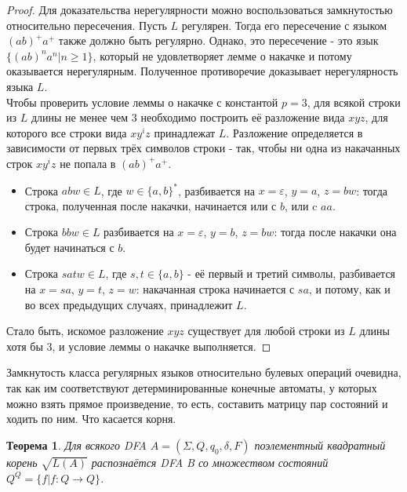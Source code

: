 \documentclass[a4paper]{article}
\theoremstyle{indented}
\newtheorem{theorem}{Теорема}
\theoremstyle{definition}
\theoremstyle{remark}
\DeclareMathOperator{\ra}{\rightarrow}
\begin{document}
\begin{proof}
    Для доказательства нерегулярности можно воспользоваться замкнутостью относительно пересечения. Пусть $L$ регулярен. Тогда его пересечение с языком $(ab)^+a^+$ также должно быть регулярно. Однако, это пересечение - это язык $\{ (ab)^n a^n | n \geq 1 \}$, который не удовлетворяет лемме о накачке и потому оказывается нерегулярным. Полученное противоречие доказывает нерегулярность языка $L$. \\ 

    Чтобы проверить условие леммы о накачке с константой $p = 3$, для всякой строки из $L$ длины не менее чем 3 необходимо построить её разложение вида $xyz$, для которого все строки вида $xy^iz$ принадлежат $L$. Разложение определяется в зависимости от первых трёх символов строки - так, чтобы ни одна из накачанных строк $xy^iz$ не попала в $(ab)^+a^+$.

    \begin{itemize}
        \item Строка $abw\in L$, где $w\in \{a,b\}^*$, разбивается на $x=\varepsilon$, $y=a$, $z=bw$: тогда строка, полученная после накачки, начинается или с $b$, или c $aa$.
        \item Строка $bbw \in L$ разбивается на $x = \varepsilon$, $y = b$, $z = bw$: тогда после накачки она будет начинаться с $b$.
        \item Строка $satw \in L$, где $s,t \in \{a,b\}$ - её первый и третий символы, разбивается на $x = sa$, $y = t$, $z = w$: накачанная строка начинается с $sa$, и потому, как и во всех предыдущих случаях, принадлежит $L$.
    \end{itemize}

    Стало быть, искомое разложение $xyz$ существует для любой строки из $L$ длины хотя бы 3, и условие леммы о накачке выполняется.
\end{proof}

Замкнутость класса регулярных языков относительно булевых операций очевидна, так как им соответствуют детерминированные конечные автоматы, у которых можно взять прямое произведение, то есть, составить матрицу пар состояний и ходить по ним. Что касается корня. \\

\begin{theorem}
    Для всякого DFA $A = (\Sigma, Q, q_0 , \delta, F )$ поэлементный квадратный корень $\sqrt{L(A)}$ распознаётся DFA B со множеством состояний $Q^Q = \{ f | f : Q \ra Q \}$.
\end{theorem}
\end{document}
